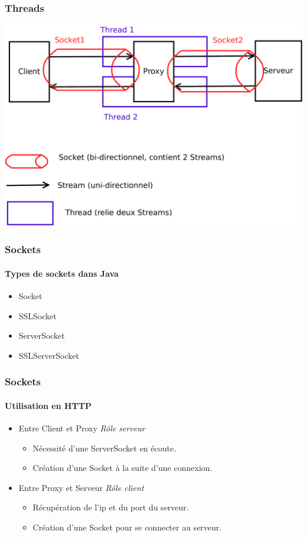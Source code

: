 	\begin{frame}
		\frametitle{Threads}		
		\includegraphics[width=\textwidth]{images/thread.pdf}
	\end{frame} 

	
	\begin{frame}
		\frametitle{Sockets}	
		\framesubtitle{Types de sockets dans Java}
		\begin{itemize}
			\item Socket
			\item SSLSocket
			\item ServerSocket
			\item SSLServerSocket
		\end{itemize}
	\end{frame} 
	
	\begin{frame}
		\frametitle{Sockets}	
		\framesubtitle{Utilisation en HTTP}
		\begin{itemize}
			\item Entre Client et Proxy \textit{Rôle serveur}
			\begin{itemize}
				\item Nécessité d'une ServerSocket en écoute.
				\item Création d'une Socket à la suite d'une connexion.
			\end{itemize}
			\item Entre Proxy et Serveur \textit{Rôle client}
			\begin{itemize}
				\item Récupération de l'ip et du port du serveur.
				\item Création d'une Socket pour se connecter au serveur.
			\end{itemize}
		\end{itemize}
	\end{frame}

